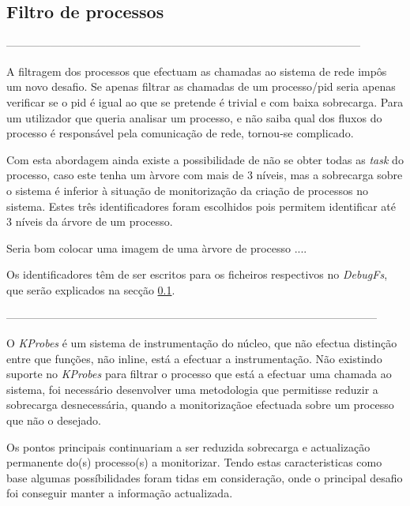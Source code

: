 \subsection{Filtro de processos}

------------------------------------------------------------------------------------------------

A filtragem dos processos que efectuam as chamadas ao sistema de rede impôs um novo desafio.
 Se apenas filtrar as chamadas de um processo/pid seria apenas verificar se o pid é igual ao que se pretende é trivial e com baixa sobrecarga.
 Para um utilizador que queria analisar um processo, e não saiba qual dos fluxos do processo é responsável pela comunicação de rede, tornou-se complicado.

Com esta abordagem ainda existe a possibilidade de não se obter todas as \textit{task} do processo, caso este tenha um àrvore com mais de 3 níveis, mas a sobrecarga sobre o sistema é inferior à situação de monitorização da criação de processos no sistema.
 Estes três identificadores foram escolhidos pois permitem identificar até 3 níveis da árvore de um processo.

Seria bom colocar uma imagem de uma àrvore de processo .... 

Os identificadores têm de ser escritos para os ficheiros respectivos no \textit{DebugFs}, que serão explicados na secção \ref{}.

-----------------------------------------------------------------------------------------------------

O \textit{KProbes} é um sistema de instrumentação do núcleo, que não efectua distinção entre que funções, não inline, está a efectuar a instrumentação.
Não existindo suporte no \textit{KProbes} para filtrar o processo que está a efectuar uma chamada ao sistema, foi necessário desenvolver uma metodologia que permitisse reduzir a sobrecarga desnecessária, quando a monitorizaçãoe efectuada sobre um processo que não o desejado.

Os pontos principais continuariam a ser reduzida sobrecarga e actualização permanente do(s) processo(s) a monitorizar.
Tendo estas caracteristicas como base algumas possíbilidades foram tidas em consideração, onde o principal desafio foi conseguir manter a informação actualizada.

